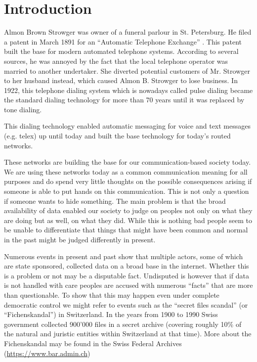 
\chapter{Introduction}
Almon Brown Strowger was owner of a funeral parlour in St. Petersburg. He filed a patent in March  1891 for an ``Automatic Telephone Exchange'' \cite{pulseDialingPatent}. This patent built the base for modern automated telephone systems. According to several sources, he was annoyed by the fact that the local telephone operator was married to another undertaker. She diverted potential customers of Mr. Strowger to her husband instead, which caused Almon B. Strowger to lose business. In 1922, this telephone dialing system which is nowadays called pulse dialing became the standard dialing technology for more than 70 years until it was replaced by tone dialing. 

This dialing technology enabled automatic messaging for voice and text messages (e.g. telex) up until today and built the base technology for today's routed networks. 

These networks are building the base for our communication-based society today. We are using these networks today as a common communication meaning for all purposes and do spend very little thoughts on the possible consequences arising if someone is able to put hands on this communication. This is not only a question if someone wants to hide something. The main problem is that the broad availability of data enabled our society to judge on peoples not only on what they are doing but as well, on what they did. While this is nothing bad people seem to be unable to differentiate that things that might have been common and normal in the past might be judged differently in present.

Numerous events in present and past show that multiple actors, some of which are state sponsored, collected data on a broad base in the internet. Whether this is a problem or not may be a disputable fact. Undisputed is however that if data is not handled with care peoples are accused with numerous ``facts'' that are more than questionable. To show that this may happen even under complete democratic control we might refer to events such as the ``secret files scandal'' (or ``Fichenskandal'') in Switzerland. In the years  from 1900 to 1990 Swiss government collected 900'000 files in a secret archive (covering roughly 10\% of the natural and juristic entities within Switzerland at that time). More about the Fichenskandal may be found in the Swiss Federal Archives (\href{https://www.bar.admin.ch/bar/de/home/recherche/suchen/themen/nachrichtendienste--spione--landesverraeter-und-staatsschutz-in-/die-politische-polizei-und-der-staatsschutz-in-der-schweiz-.html#903994184}{https://www.bar.admin.ch}) 

